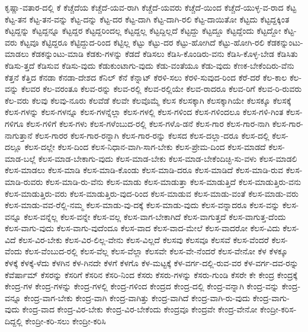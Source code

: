 {ಕೃಷ್ಣಾ-ವತಾರ-ದಲ್ಲಿ
ಕೆ
ಕೆಚ್ಚೆದೆಯ
ಕೆಚ್ಚೆದೆ-ಯವ-ರಾಗಿ
ಕೆಚ್ಚೆದೆ-ಯವರು
ಕೆಚ್ಚೆದೆ-ಯಿಂದ
ಕೆಚ್ಚೆದೆ-ಯುಳ್ಳ-ವ-ರಾದ
ಕೆಟ್ಟ
ಕೆಟ್ಟ-ತನ
ಕೆಟ್ಟ-ತನ-ವನ್ನು
ಕೆಟ್ಟ-ದನ್ನು
ಕೆಟ್ಟ-ದರ
ಕೆಟ್ಟ-ದಾಗಿ
ಕೆಟ್ಟ-ದಾಗಿ-ರಲಿ
ಕೆಟ್ಟ-ದಾಯಿತೋ
ಕೆಟ್ಟದು
ಕೆಟ್ಟದ್ದಕ್ಕಿಂತ
ಕೆಟ್ಟದ್ದನ್ನು
ಕೆಟ್ಟದ್ದನ್ನೂ
ಕೆಟ್ಟದ್ದರ
ಕೆಟ್ಟದ್ದರಿಂದಲ್ಲ
ಕೆಟ್ಟದ್ದಲ್ಲ
ಕೆಟ್ಟದ್ದಿಲ್ಲದೆ
ಕೆಟ್ಟದ್ದು
ಕೆಟ್ಟದ್ದೂ
ಕೆಟ್ಟದ್ದೆಂದು
ಕೆಟ್ಟದ್ದೋ
ಕೆಟ್ಟ-ವರು
ಕೆಟ್ಟವೂ
ಕೆಟ್ಟಿದ್ದರೂ
ಕೆಟ್ಟಿದ್ದುದ-ರಿಂದ
ಕೆಟ್ಟಿಲ್ಲ
ಕೆಟ್ಟು
ಕೆಟ್ಟು-ದರ
ಕೆಟ್ಟು-ಹೋಗಿದೆ
ಕೆಟ್ಟು-ಹೋಗಿ-ರಲಿ
ಕೆಡಕನ್ನುಂಟು-ಮಾಡಲು
ಕೆಡಕನ್ನುಂಟು-ಮಾಡಿ
ಕೆಡಕು-ಗಳನ್ನು
ಕೆಡದೆ
ಕೆಡಿಸಲು
ಕೆಡಿಸಿ-ಕೊಂಡಿರು-ವನು
ಕೆಡಿಸಿ-ಕೊಳ್ಳ-ಬೇಡ
ಕೆಡಿಸಿತು
ಕೆಡಿಸು-ತ್ತದೆ
ಕೆಡಿಸುವ
ಕೆಡಿಸು-ವುದು
ಕೆಡುಕುಂಟಾಗು-ವುದು
ಕೆಡು-ವಂತೆಯೂ
ಕೆಡು-ವುದು
ಕೆಣಕ-ಬೇಕೆಂದಿರು-ವೆನು
ಕೆತ್ತನೆ
ಕೆತ್ತಿದ
ಕೆನಡಾ
ಕೆನಡಾ-ದೇಶದ
ಕೆನಿಲ್
ಕೆನೆ
ಕೆನ್ನಾಟ್
ಕೆರಳಿ-ಸಲು
ಕೆರಳಿ-ಸುವುದ-ರಿಂದ
ಕೆರೆ-ದರೆ
ಕೆಲ-ಕಾಲ
ಕೆಲ-ವನ್ನು
ಕೆಲವರ
ಕೆಲ-ವರಂತೂ
ಕೆಲವ-ರನ್ನು
ಕೆಲವ-ರಲ್ಲಿ
ಕೆಲವ-ರಲ್ಲಿಯೇ
ಕೆಲವ-ರಾದರೂ
ಕೆಲವ-ರಿಗೆ
ಕೆಲವ-ರಿ-ರುವರು
ಕೆಲ-ವರು
ಕೆಲವು
ಕೆಲವು-ನೂರು
ಕೆಲವೆಡೆ
ಕೆಲವೇ
ಕೆಲವೊಮ್ಮೆ
ಕೆಲಸ
ಕೆಲಸಕ್ಕಾಗಿ
ಕೆಲಸಕ್ಕಾಗಿಯೇ
ಕೆಲಸಕ್ಕೂ
ಕೆಲಸಕ್ಕೆ
ಕೆಲಸ-ಗಳನ್ನು
ಕೆಲಸ-ಗಳನ್ನೂ
ಕೆಲಸ-ಗಳನ್ನೆಲ್ಲಾ
ಕೆಲಸ-ಗಳಲ್ಲಿ
ಕೆಲಸ-ಗಳಿಂದ
ಕೆಲಸ-ಗಳಿಂದಲೂ
ಕೆಲಸ-ಗಳಿ-ಗಿಂತ
ಕೆಲಸ-ಗಳಿಗೂ
ಕೆಲಸ-ಗಳಿಗೆ
ಕೆಲಸ-ಗಳು
ಕೆಲಸ-ಗಳೆಂಬುದ-ರಲ್ಲಿ
ಕೆಲಸ-ಗಳೊ-ಡನೆ
ಕೆಲಸ-ಗಾರ
ಕೆಲಸ-ಗಾರ-ನಾಗಿ
ಕೆಲಸ-ಗಾರ-ನಾಗುತ್ತಾನೆ
ಕೆಲಸ-ಗಾರರ
ಕೆಲಸ-ಗಾರ-ರನ್ನಾಗಿ
ಕೆಲಸ-ಗಾರ-ರನ್ನು
ಕೆಲಸದ
ಕೆಲಸ-ದಲ್ಲಾ-ದರೂ
ಕೆಲಸ-ದಲ್ಲಿ
ಕೆಲಸ-ದಲ್ಲೂ
ಕೆಲಸ-ದಲ್ಲೇ
ಕೆಲಸ-ದಿಂದ
ಕೆಲಸ-ನಿಧಾನ-ವಾಗಿ-ಸಾಗ-ಬೇಕು
ಕೆಲಸ-ಪ್ರೇಮ-ದಿಂದ
ಕೆಲಸ-ಮಾಡದೆ
ಕೆಲಸ-ಮಾಡ-ಬಲ್ಲೆ
ಕೆಲಸ-ಮಾಡ-ಬೇಕಾಗು-ವುದು
ಕೆಲಸ-ಮಾಡ-ಬೇಕು
ಕೆಲಸ-ಮಾಡ-ಬೇಕೆಂದಿಚ್ಛಿ-ಸು-ವಳು
ಕೆಲಸ-ಮಾಡಲಿ
ಕೆಲಸ-ಮಾಡಲು
ಕೆಲಸ-ಮಾಡಿ
ಕೆಲಸ-ಮಾಡಿ-ಕೊಂಡು
ಕೆಲಸ-ಮಾಡಿ-ದರೂ
ಕೆಲಸ-ಮಾಡಿದೆ
ಕೆಲಸ-ಮಾಡಿ-ರುವ
ಕೆಲಸ-ಮಾಡಿ-ರುವರು
ಕೆಲಸ-ಮಾಡಿ-ರು-ವೆನು
ಕೆಲಸ-ಮಾಡು
ಕೆಲಸ-ಮಾಡುತ್ತಾ
ಕೆಲಸ-ಮಾಡುತ್ತಿದೆ
ಕೆಲಸ-ಮಾಡುತ್ತಿರು-ವನು
ಕೆಲಸ-ಮಾಡುತ್ತಿರು-ವರು
ಕೆಲಸ-ಮಾಡುತ್ತಿರು-ವುದ-ರಿಂದ
ಕೆಲಸ-ಮಾಡುವ
ಕೆಲಸ-ಮಾಡು-ವಂತೆ
ಕೆಲಸ-ಮಾಡು-ವರು
ಕೆಲಸ-ಮಾಡು-ವವ-ರೆಲ್ಲಿ-ನಮ್ಮ
ಕೆಲಸ-ಮಾಡು-ವು-ದಕ್ಕೆ
ಕೆಲಸ-ಮಾಡು-ವುದು
ಕೆಲಸ-ವನ್ನಾದರೂ
ಕೆಲಸ-ವನ್ನು
ಕೆಲಸ-ವನ್ನೂ
ಕೆಲಸ-ವನ್ನೆಲ್ಲ
ಕೆಲಸ-ವನ್ನೇ
ಕೆಲಸ-ವಲ್ಲ
ಕೆಲಸ-ವಾಗ-ಬೇಕಾಗಿದೆ
ಕೆಲಸ-ವಾಗುತ್ತದೆ
ಕೆಲಸ-ವಾಗುತ್ತ-ದೆಂದು
ಕೆಲಸ-ವಾಗು-ವುದು
ಕೆಲಸ-ವಾಗು-ವುದೆಂದೂ
ಕೆಲಸ-ವಾದ
ಕೆಲಸ-ವಾದ-ಮೇಲೆ
ಕೆಲಸ-ವಾದರೋ
ಕೆಲಸ-ವಿದು
ಕೆಲಸ-ವಿದೆ
ಕೆಲಸ-ವಿರ-ಬೇಕು
ಕೆಲಸ-ವಿರ-ಲಿಲ್ಲ-ವೇನು
ಕೆಲಸ-ವಿಲ್ಲದೆ
ಕೆಲಸವು
ಕೆಲಸವೂ
ಕೆಲಸವೆ
ಕೆಲಸ-ವೆಂದರೆ
ಕೆಲಸ-ವೆಂದು
ಕೆಲಸ-ವೆಂಬುದ-ರಲ್ಲಿ
ಕೆಲಸ-ವೆಲ್ಲ
ಕೆಲಸ-ವೆಲ್ಲಾ
ಕೆಲಸವೇ
ಕೆಲಸ-ವೇ-ನೆಂದರೆ
ಕೆಲಸ-ವೇನೋ
ಕೆಳ
ಕೆಳಕ್ಕೂ
ಕೆಳಕ್ಕೆ
ಕೆಳಕ್ಕೆ-ಳೆದು
ಕೆಳಗಿನ
ಕೆಳ-ಗಿನದೇ
ಕೆಳಗೆ
ಕೆಳಗೊ
ಕೆಳ-ಮಟ್ಟಕ್ಕೆ
ಕೆಳ-ವರ್ಗ-ದಲ್ಲಿ-ರುವ-ವರ
ಕೆಳ-ವರ್ಗ-ದವ-ರನ್ನು
ಕೆವೆರ್ಷಾಮ್
ಕೆಸರನ್ನು
ಕೆಸರಿಗೆ
ಕೆಸರಿನ
ಕೆಸರಿ-ನಿಂದ
ಕೆಸರು
ಕೆಸರು-ಗಳನ್ನು
ಕೆಸರು-ಗುಂಡಿ
ಕೆಸರೇ
ಕೇ
ಕೇಂದ್ರ
ಕೇಂದ್ರಕ್ಕೆ
ಕೇಂದ್ರ-ಗಳ
ಕೇಂದ್ರ-ಗಳನ್ನು
ಕೇಂದ್ರ-ಗಳಲ್ಲಿ
ಕೇಂದ್ರ-ಗಳಿಂದ
ಕೇಂದ್ರದ
ಕೇಂದ್ರ-ದಲ್ಲಿ
ಕೇಂದ್ರ-ವನ್ನಾಗಿ
ಕೇಂದ್ರ-ವನ್ನು
ಕೇಂದ್ರ-ವನ್ನೂ
ಕೇಂದ್ರ-ವಾಗ-ಬೇಕು
ಕೇಂದ್ರ-ವಾಗಿ
ಕೇಂದ್ರ-ವಾಗಿತ್ತು
ಕೇಂದ್ರ-ವಾಗಿದೆ
ಕೇಂದ್ರ-ವಾಗಿ-ರು-ವುದು
ಕೇಂದ್ರ-ವಾಗು-ವುದು
ಕೇಂದ್ರ-ವಾದ
ಕೇಂದ್ರ-ವಿರ-ಬೇಕು
ಕೇಂದ್ರ-ವಿರ-ಬೇಕೆಂದು
ಕೇಂದ್ರವೂ
ಕೇಂದ್ರವೇ
ಕೇಂದ್ರ-ವೇನೋ
ಕೇಂದ್ರೀ-ಕರಿಸ-ದಿದ್ದಲ್ಲಿ
ಕೇಂದ್ರೀ-ಕರಿ-ಸಲು
ಕೇಂದ್ರೀ-ಕರಿಸಿ
}
